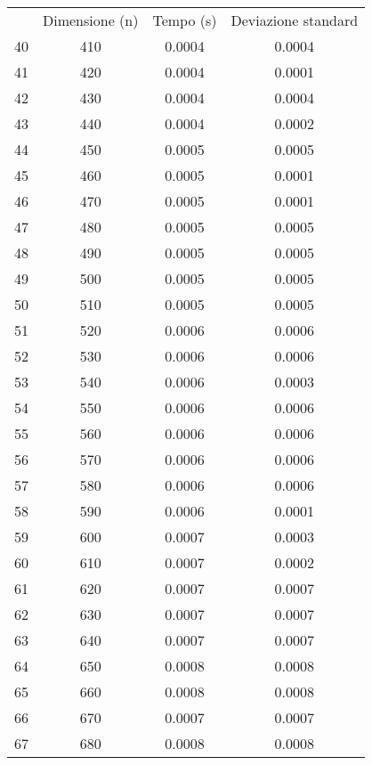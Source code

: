 \begin{table}
\centering
\begin{adjustbox}{width=1\textwidth/2}
\begin{tabular}{|c|c|c|c|}
\hline
 & Dimensione (n) & Tempo (s) & Deviazione standard \\
40 & 410 & 0.0004 & 0.0004 \\
\cline{1-4}
41 & 420 & 0.0004 & 0.0001 \\
\cline{1-4}
42 & 430 & 0.0004 & 0.0004 \\
\cline{1-4}
43 & 440 & 0.0004 & 0.0002 \\
\cline{1-4}
44 & 450 & 0.0005 & 0.0005 \\
\cline{1-4}
45 & 460 & 0.0005 & 0.0001 \\
\cline{1-4}
46 & 470 & 0.0005 & 0.0001 \\
\cline{1-4}
47 & 480 & 0.0005 & 0.0005 \\
\cline{1-4}
48 & 490 & 0.0005 & 0.0005 \\
\cline{1-4}
49 & 500 & 0.0005 & 0.0005 \\
\cline{1-4}
50 & 510 & 0.0005 & 0.0005 \\
\cline{1-4}
51 & 520 & 0.0006 & 0.0006 \\
\cline{1-4}
52 & 530 & 0.0006 & 0.0006 \\
\cline{1-4}
53 & 540 & 0.0006 & 0.0003 \\
\cline{1-4}
54 & 550 & 0.0006 & 0.0006 \\
\cline{1-4}
55 & 560 & 0.0006 & 0.0006 \\
\cline{1-4}
56 & 570 & 0.0006 & 0.0006 \\
\cline{1-4}
57 & 580 & 0.0006 & 0.0006 \\
\cline{1-4}
58 & 590 & 0.0006 & 0.0001 \\
\cline{1-4}
59 & 600 & 0.0007 & 0.0003 \\
\cline{1-4}
60 & 610 & 0.0007 & 0.0002 \\
\cline{1-4}
61 & 620 & 0.0007 & 0.0007 \\
\cline{1-4}
62 & 630 & 0.0007 & 0.0007 \\
\cline{1-4}
63 & 640 & 0.0007 & 0.0007 \\
\cline{1-4}
64 & 650 & 0.0008 & 0.0008 \\
\cline{1-4}
65 & 660 & 0.0008 & 0.0008 \\
\cline{1-4}
66 & 670 & 0.0007 & 0.0007 \\
\cline{1-4}
67 & 680 & 0.0008 & 0.0008 \\
\cline{1-4}

\end{tabular}
\end{adjustbox}
\end{table}
